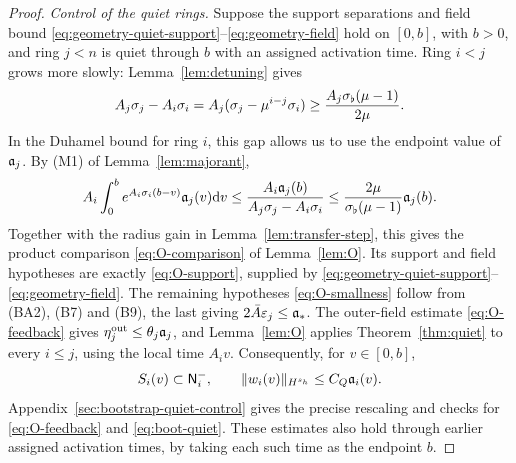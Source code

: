\begin{proof}
\label{par:relay-quiet}
\emph{Control of the quiet rings.}
Suppose the support separations and field bound
\eqref{eq:geometry-quiet-support}--\eqref{eq:geometry-field} hold on
$[0,b]$, with $b>0$, and ring $j<n$ is quiet through $b$ with an assigned
activation time. Ring $i<j$ grows more slowly:
Lemma~\ref{lem:detuning} gives
\begin{equation}
\label{eq:relay-growth-gap}
A_j\sigma_j-A_i\sigma_i
=A_j(\sigma_j-\mu^{i-j}\sigma_i)
\ge\frac{A_j\sigma_\flat(\mu-1)}{2\mu}.
\end{equation}
In the Duhamel bound for ring $i$, this gap allows us to use the endpoint
value of $\mathfrak{a}_j$. By (M1) of Lemma~\ref{lem:majorant},
\begin{equation}
\label{eq:relay-duhamel-comparison}
A_i\int_0^b e^{A_i\sigma_i(b-v)}\mathfrak{a}_j(v)\dd v
\le \frac{A_i\mathfrak{a}_j(b)}{A_j\sigma_j-A_i\sigma_i}
\le\frac{2\mu}{\sigma_\flat(\mu-1)}\mathfrak{a}_j(b).
\end{equation}
Together with the radius gain in Lemma~\ref{lem:transfer-step}, this gives
the product comparison \eqref{eq:O-comparison} of Lemma~\ref{lem:O}.
Its support and field hypotheses are exactly \eqref{eq:O-support}, supplied
by \eqref{eq:geometry-quiet-support}--\eqref{eq:geometry-field}.
The remaining hypotheses \eqref{eq:O-smallness} follow from (BA2), (B7)
and (B9), the last giving $2\bar A\varepsilon_j\le\mathfrak{a}_*$.
The outer-field estimate \eqref{eq:O-feedback} gives
$\eta^{\mathrm{out}}_j\le\theta_j\mathfrak{a}_j$, and Lemma~\ref{lem:O} applies Theorem~\ref{thm:quiet} to every
$i\le j$, using the local time $A_iv$. Consequently, for $v\in[0,b]$,
\begin{equation}
\label{eq:boot-quiet}
S_i(v)\subset\mathsf{N}^{-}_i,\qquad \|w_i(v)\|_{H^{s_h}}\le C_Q\mathfrak{a}_i(v).
\end{equation}
Appendix~\ref{sec:bootstrap-quiet-control} gives the precise rescaling and
checks for \eqref{eq:O-feedback} and \eqref{eq:boot-quiet}.
These estimates also hold through earlier assigned activation times, by
taking each such time as the endpoint $b$.


\end{proof}
